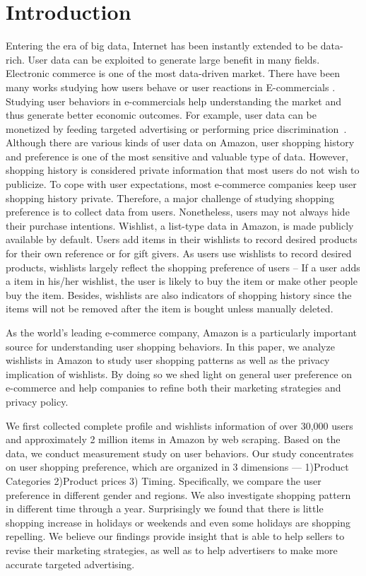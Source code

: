 \section{Introduction}
Entering the era of big data, Internet has been instantly extended to be data-rich. User data can be exploited to generate large benefit in many fields. Electronic commerce is one of the most data-driven market. There have been many works studying how users behave or user reactions in E-commercials \cite{tsai2011effect, ghose2011estimating, ivanova2013does}. Studying user behaviors in e-commercials help understanding the market and thus generate better economic outcomes. For example, user data can be monetized by feeding targeted advertising or performing price discrimination~\cite{mikians2012detecting}. Although there are various kinds of user data on Amazon, user shopping history and preference is one of the most sensitive and valuable type of data. However, shopping history is considered private information that most users do not wish to publicize. To cope with user expectations, most e-commerce companies keep user shopping history private. Therefore, a major challenge of studying shopping preference is to collect data from users. Nonetheless, users may not always hide their purchase intentions. Wishlist, a list-type data in Amazon, is made publicly available by default. Users add items in their wishlists to record desired products for their own reference or for gift givers. As users use wishlists to record desired products, wishlists largely reflect the shopping preference of users -- If a user adds a item in his/her wishlist, the user is likely to buy the item or make other people buy the item. Besides, wishlists are also indicators of shopping history since the items will not be removed after the item is bought unless manually deleted.

As the world's leading e-commerce company, Amazon is a particularly important source for understanding user shopping behaviors. In this paper, we analyze wishlists in Amazon to study user shopping patterns as well as the privacy implication of wishlists. By doing so we shed light on general user preference on e-commerce and help companies to refine both their marketing strategies and privacy policy.

We first collected complete profile and wishlists information of over 30,000 users and approximately 2 million items in Amazon by web scraping. Based on the data, we conduct measurement study on user behaviors. Our study concentrates on user shopping preference, which are organized in 3 dimensions — 1)Product Categories 2)Product prices 3) Timing. Specifically, we compare the user preference in different gender and regions. We also investigate shopping pattern in different time through a year. Surprisingly we found that there is little shopping increase in holidays or weekends and even some holidays are shopping repelling. We believe our findings provide insight that is able to help sellers to revise their marketing strategies, as well as to help advertisers to make more accurate targeted advertising. 

